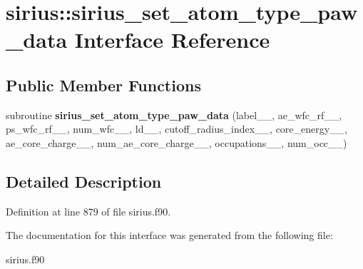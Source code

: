 \hypertarget{interfacesirius_1_1sirius__set__atom__type__paw__data}{}\section{sirius\+:\+:sirius\+\_\+set\+\_\+atom\+\_\+type\+\_\+paw\+\_\+data Interface Reference}
\label{interfacesirius_1_1sirius__set__atom__type__paw__data}
\subsection*{Public Member Functions}
\begin{DoxyCompactItemize}
\item 
\hypertarget{interfacesirius_1_1sirius__set__atom__type__paw__data_a463a6a475f8d0bb7acbb94563cf71f85}{}subroutine {\bfseries sirius\+\_\+set\+\_\+atom\+\_\+type\+\_\+paw\+\_\+data} (label\+\_\+\+\_\+,                                           ae\+\_\+wfc\+\_\+rf\+\_\+\+\_\+,                                           ps\+\_\+wfc\+\_\+rf\+\_\+\+\_\+,                                           num\+\_\+wfc\+\_\+\+\_\+,                                       ld\+\_\+\+\_\+,                                       cutoff\+\_\+radius\+\_\+index\+\_\+\+\_\+,                                       core\+\_\+energy\+\_\+\+\_\+,                                       ae\+\_\+core\+\_\+charge\+\_\+\+\_\+,                                       num\+\_\+ae\+\_\+core\+\_\+charge\+\_\+\+\_\+,                                       occupations\+\_\+\+\_\+,                                       num\+\_\+occ\+\_\+\+\_\+)\label{interfacesirius_1_1sirius__set__atom__type__paw__data_a463a6a475f8d0bb7acbb94563cf71f85}

\end{DoxyCompactItemize}


\subsection{Detailed Description}


Definition at line 879 of file sirius.\+f90.



The documentation for this interface was generated from the following file\+:\begin{DoxyCompactItemize}
\item 
sirius.\+f90\end{DoxyCompactItemize}
